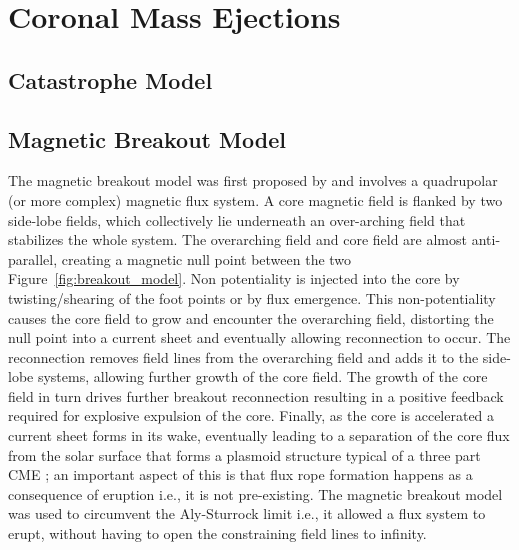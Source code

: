 \section{Coronal Mass Ejections}\label{sec:2}

\subsection{Catastrophe Model}\label{sec:20}

\subsection{Magnetic Breakout Model}\label{sec:21}

The magnetic breakout model was first proposed by \citep{antiochos1999} and involves a quadrupolar (or more complex) magnetic flux system. A core magnetic field is flanked by two side-lobe fields, which collectively lie underneath an over-arching field that stabilizes the whole system. The overarching field and core field are almost anti-parallel, creating a magnetic null point between the two Figure~\ref{fig:breakout_model}. Non potentiality is injected into the core by twisting/shearing of the foot points or by flux emergence. This non-potentiality causes the core field to grow and encounter the overarching field, distorting the null point into a current sheet and eventually allowing reconnection to occur. The reconnection removes field lines from the overarching field and adds it to the side-lobe systems, allowing further growth of the core field. The growth of the core field in turn drives further breakout reconnection resulting in a positive feedback required for explosive expulsion of the core. Finally, as the core is accelerated a current sheet forms in its wake, eventually leading to a separation of the core flux from the solar surface that forms a plasmoid structure typical of a three part CME \citep{lynch2004}; an important aspect of this is that flux rope formation happens as a consequence of eruption i.e., it is not pre-existing. The magnetic breakout model was used to circumvent the Aly-Sturrock limit \citep{aly1991, sturrock1991} i.e., it allowed a flux system to erupt, without having to open the constraining field lines to infinity.
